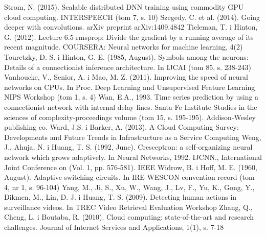 \documentclass[12pt,a4paper,twoside]{article}
\begin{document}
\begin{thebibliography}{99}
 Strom, N. (2015). Scalable distributed DNN training using commodity GPU cloud computing. INTERSPEECH (tom 7, s. 10)
 Szegedy, C. et al. (2014). Going deeper with convolutions. arXiv preprint arXiv:1409.4842
 Tieleman, T. i Hinton, G. (2012). Lecture 6.5-rmsprop: Divide the gradient by a running average of its recent magnitude. COURSERA: Neural networks for machine learning, 4(2)
 Touretzky, D. S. i Hinton, G. E. (1985, August). Symbols among the neurons: Details of a connectionist inference architecture. In IJCAI (tom 85, s. 238-243)
 Vanhoucke, V., Senior, A. i Mao, M. Z. (2011). Improving the speed of neural networks on CPUs. In Proc. Deep Learning and Unsupervised Feature Learning NIPS Workshop (tom 1, s. 4)
 Wan, E.A., 1993. Time series prediction by using a connectionist network with internal delay lines. Santa Fe Institute Studies in the sciences of complexity-proceedings volume (tom 15, s. 195-195). Addison-Wesley publishing co.
 Ward, J.S. i Barker, A. (2013). A Cloud Computing Survey: Developments and Future Trends in Infrastructure as a Service Computing
 Weng, J., Ahuja, N. i Huang, T. S. (1992, June). Cresceptron: a self-organizing neural network which grows adaptively. In Neural Networks, 1992. IJCNN., International Joint Conference on (Vol. 1, pp. 576-581). IEEE
 Widrow, B. i Hoff, M. E. (1960, August). Adaptive switching circuits. In IRE WESCON convention record (tom 4, nr 1, s. 96-104)
 Yang, M., Ji, S., Xu, W., Wang, J., Lv, F., Yu, K., Gong, Y., Dikmen, M., Lin, D. J. i Huang, T. S. (2009). Detecting human actions in surveillance videos. In TREC Video Retrieval Evaluation Workshop
 Zhang, Q., Cheng, L. i Boutaba, R. (2010). Cloud computing: state-of-the-art and research challenges. Journal of Internet Services and Applications, 1(1), s. 7-18

\end{thebibliography}
\clearpage

\listoffigures

\clearpage

\listoftables

\clearpage
\end{document}
